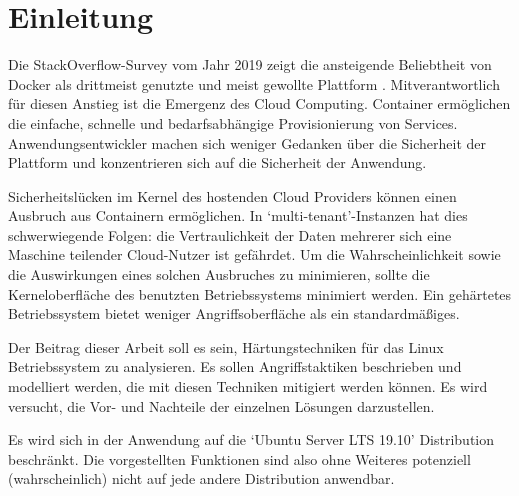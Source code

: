 \chapter{Einleitung}

Die StackOverflow-Survey vom Jahr 2019 zeigt die ansteigende Beliebtheit von Docker als drittmeist genutzte und meist gewollte Plattform \cite{so-survey-2019}. Mitverantwortlich für diesen Anstieg ist die Emergenz des Cloud Computing. Container ermöglichen die einfache, schnelle und bedarfsabhängige Provisionierung von Services. Anwendungsentwickler machen sich weniger Gedanken über die Sicherheit der Plattform und konzentrieren sich auf die Sicherheit der Anwendung.

Sicherheitslücken im Kernel des hostenden Cloud Providers können einen Ausbruch aus Containern ermöglichen. In `multi-tenant'-Instanzen hat dies schwerwiegende Folgen: die Vertraulichkeit der Daten mehrerer sich eine Maschine teilender Cloud-Nutzer ist gefährdet.
Um die Wahrscheinlichkeit sowie die Auswirkungen eines solchen Ausbruches zu minimieren, sollte die Kerneloberfläche des benutzten Betriebssystems minimiert werden. Ein gehärtetes Betriebssystem bietet weniger Angriffsoberfläche als ein standardmäßiges.

Der Beitrag dieser Arbeit soll es sein, Härtungstechniken für das Linux Betriebssystem zu analysieren. Es sollen Angriffstaktiken beschrieben und modelliert werden, die mit diesen Techniken mitigiert werden können. Es wird versucht, die Vor- und Nachteile der einzelnen Lösungen darzustellen.

Es wird sich in der Anwendung auf die `Ubuntu Server LTS 19.10' Distribution beschränkt. Die vorgestellten Funktionen sind also ohne Weiteres potenziell (wahrscheinlich) nicht auf jede andere Distribution anwendbar.
